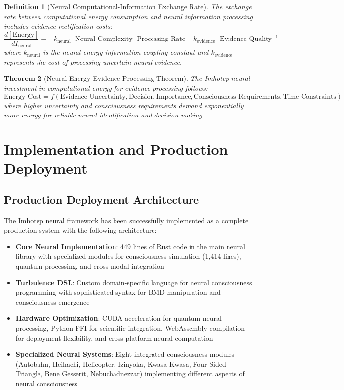 \documentclass[12pt,a4paper]{article}
\newtheorem{theorem}{Theorem}[section]
\newtheorem{definition}[theorem]{Definition}
\theoremstyle{remark}
\begin{document}
\begin{definition}[Neural Computational-Information Exchange Rate]
The exchange rate between computational energy consumption and neural information processing includes evidence rectification costs:
\begin{equation}
\frac{d[\text{Energy}]}{dI_{\text{neural}}} = -k_{\text{neural}} \cdot \text{Neural Complexity} \cdot \text{Processing Rate} - k_{\text{evidence}} \cdot \text{Evidence Quality}^{-1}
\end{equation}
where $k_{\text{neural}}$ is the neural energy-information coupling constant and $k_{\text{evidence}}$ represents the cost of processing uncertain neural evidence.
\end{definition}

\begin{theorem}[Neural Energy-Evidence Processing Theorem]
The Imhotep neural investment in computational energy for evidence processing follows:
\begin{equation}
\text{Energy Cost} = f(\text{Evidence Uncertainty}, \text{Decision Importance}, \text{Consciousness Requirements}, \text{Time Constraints})
\end{equation}
where higher uncertainty and consciousness requirements demand exponentially more energy for reliable neural identification and decision making.
\end{theorem}

\section{Implementation and Production Deployment}

\subsection{Production Deployment Architecture}

The Imhotep neural framework has been successfully implemented as a complete production system with the following architecture:

\begin{itemize}
\item \textbf{Core Neural Implementation}: 449 lines of Rust code in the main neural library with specialized modules for consciousness simulation (1,414 lines), quantum processing, and cross-modal integration
\item \textbf{Turbulence DSL}: Custom domain-specific language for neural consciousness programming with sophisticated syntax for BMD manipulation and consciousness emergence
\item \textbf{Hardware Optimization}: CUDA acceleration for quantum neural processing, Python FFI for scientific integration, WebAssembly compilation for deployment flexibility, and cross-platform neural computation
\item \textbf{Specialized Neural Systems}: Eight integrated consciousness modules (Autobahn, Heihachi, Helicopter, Izinyoka, Kwasa-Kwasa, Four Sided Triangle, Bene Gesserit, Nebuchadnezzar) implementing different aspects of neural consciousness
\end{itemize}
\end{document}
